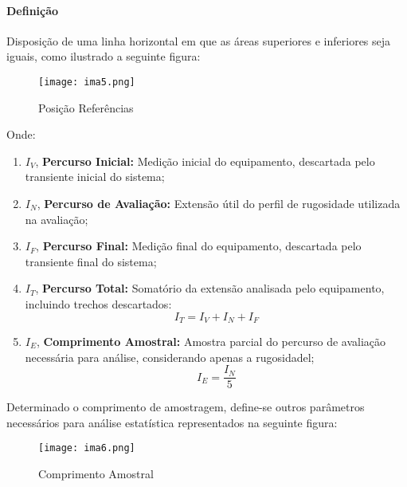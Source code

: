 \documentclass{article}
\begin{document}
            \paragraph{Definição}Disposição de uma linha horizontal em que as áreas superiores e inferiores seja iguais, como ilustrado a seguinte figura:
                    \begin{figure}[H]
                        \centering
                        \texttt{[image: ima5.png]}
                        \caption{Posição Referências}\label{fig:sistemaM}
                    \end{figure} \noindent
            Onde:
                \begin{enumerate}[rightmargin = \leftmargin, noitemsep]
                    \item $I_{V}$, \textbf{Percurso Inicial:} Medição inicial do equipamento, descartada pelo transiente inicial do sistema;
                    \item $I_{N}$, \textbf{Percurso de Avaliação:} Extensão útil do perfil de rugosidade utilizada na avaliação;
                    \item $I_{F}$, \textbf{Percurso Final:} Medição final do equipamento, descartada pelo transiente final do sistema;\vspace{5mm}
                    \item $I_{T}$, \textbf{Percurso Total:} Somatório da extensão analisada pelo equipamento, incluindo trechos descartados:
                        \begin{equation}
                            \boxed{
                                I_{T} = I_{V} + I_{N} + I_{F}
                            }
                        \end{equation}
                    \item $I_{E}$, \textbf{Comprimento Amostral:} Amostra parcial do percurso de avaliação necessária para análise, considerando apenas a rugosidadel;
                        \begin{equation}
                            \boxed{
                                I_{E} = \frac{I_{N}}{5}
                            }
                        \end{equation}
                \end{enumerate}
            Determinado o comprimento de amostragem, define-se outros parâmetros necessários para análise estatística representados na seguinte figura:
                \begin{figure}[H]
                    \centering
                    \texttt{[image: ima6.png]}
                    \caption{Comprimento Amostral}\label{fig:comprimentoA}
                \end{figure} \noindent
\end{document}
